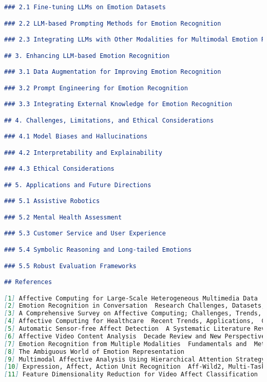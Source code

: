 \begin{lstlisting}[language=markdown,style=markdownstyle]
### 2.1 Fine-tuning LLMs on Emotion Datasets

### 2.2 LLM-based Prompting Methods for Emotion Recognition

### 2.3 Integrating LLMs with Other Modalities for Multimodal Emotion Recognition

## 3. Enhancing LLM-based Emotion Recognition

### 3.1 Data Augmentation for Improving Emotion Recognition

### 3.2 Prompt Engineering for Emotion Recognition

### 3.3 Integrating External Knowledge for Emotion Recognition

## 4. Challenges, Limitations, and Ethical Considerations

### 4.1 Model Biases and Hallucinations

### 4.2 Interpretability and Explainability

### 4.3 Ethical Considerations

## 5. Applications and Future Directions

### 5.1 Assistive Robotics

### 5.2 Mental Health Assessment

### 5.3 Customer Service and User Experience

### 5.4 Symbolic Reasoning and Long-tailed Emotions

### 5.5 Robust Evaluation Frameworks

## References

[1] Affective Computing for Large-Scale Heterogeneous Multimedia Data  A  Survey
[2] Emotion Recognition in Conversation  Research Challenges, Datasets, and  Recent Advances
[3] A Comprehensive Survey on Affective Computing; Challenges, Trends,  Applications, and Future Directions
[4] Affective Computing for Healthcare  Recent Trends, Applications,  Challenges, and Beyond
[5] Automatic Sensor-free Affect Detection  A Systematic Literature Review
[6] Affective Video Content Analysis  Decade Review and New Perspectives
[7] Emotion Recognition from Multiple Modalities  Fundamentals and  Methodologies
[8] The Ambiguous World of Emotion Representation
[9] Multimodal Affective Analysis Using Hierarchical Attention Strategy with  Word-Level Alignment
[10] Expression, Affect, Action Unit Recognition  Aff-Wild2, Multi-Task  Learning and ArcFace
[11] Feature Dimensionality Reduction for Video Affect Classification  A  Comparative Study

\end{lstlisting}


